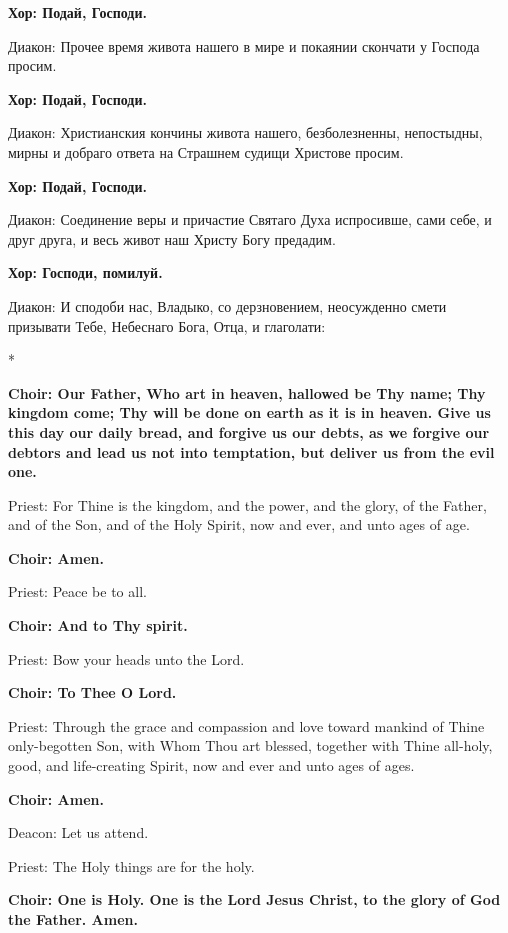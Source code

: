 \documentclass[12pt,a4paper,titlepage]{report}
\begin{document}
\begin{paracol}[1]{2}
	\textbf{Хор: Подай, Господи.}
	
	Диакон:	Прочее время живота нашего в мире и покаянии скончати у Господа просим.
	
	\textbf{Хор: Подай, Господи.}
	
	Диакон:	Христианския кончины живота нашего, безболезненны, непостыдны, мирны и добраго ответа на Страшнем судищи Христове просим.
	
	\textbf{Хор: Подай, Господи.}
	
	Диакон:	Соединение веры и причастие Святаго Духа испросивше, сами себе, и друг друга, и весь живот наш Христу Богу предадим.
	
	\textbf{Хор: Господи, помилуй.}
	
	Диакон: 	И сподоби нас, Владыко, со дерзновением, неосужденно смети призывати Тебе, Небеснаго Бога, Отца, и глаголати:
	
	\switchcolumn[0]*
	
	\textbf{Choir: Our Father, Who art in heaven, hallowed be Thy name; Thy kingdom come; Thy will be done on earth as it is in heaven. Give us this day our daily bread, and forgive us our debts, as we forgive our debtors and lead us not into temptation, but deliver us from the evil one.}

    Priest: For Thine is the kingdom, and the power, and the glory, of the Father, and of the Son, and of the Holy Spirit, now and ever, and unto ages of age.

    \textbf{Choir: Amen.}

    Priest: Peace be to all.

    \textbf{Choir: And to Thy spirit.}

    Priest: Bow your heads unto the Lord.

    \textbf{Choir: To Thee O Lord.}

    Priest: Through the grace and compassion and love toward mankind of Thine only-begotten Son, with Whom Thou art blessed, together with Thine all-holy, good, and life-creating Spirit, now and ever and unto ages of ages.
    
    \textbf{Choir: Amen.}
    
    Deacon: Let us attend.

    Priest: The Holy things are for the holy.
    
    \textbf{Choir: One is Holy. One is the Lord Jesus Christ, to the glory of God the Father. Amen.}


\end{paracol}
\end{document}
